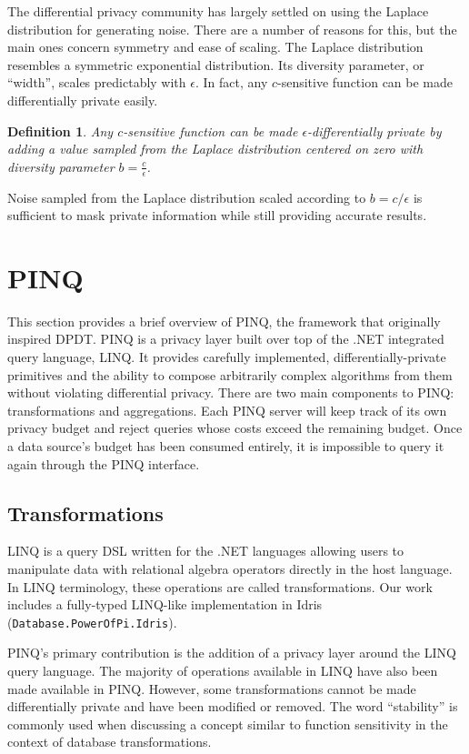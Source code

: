 \documentclass[12pt]{report}
\newtheorem{defn}{Definition}[section]
\begin{document}
The differential privacy community has largely settled on using the Laplace distribution for generating noise.
There are a number of reasons for this, but the main ones concern symmetry and ease of scaling.
The Laplace distribution resembles a symmetric exponential distribution.
Its diversity parameter, or ``width'', scales predictably with $\epsilon$.
In fact, any $c$-sensitive function can be made differentially private easily.

\begin{defn}
Any $c$-sensitive function can be made $\epsilon$-differentially private by adding a value sampled from the Laplace distribution centered on zero with diversity parameter $b=\frac{c}{\epsilon}$.
\end{defn}

Noise sampled from the Laplace distribution scaled according to $b=c/\epsilon$ is sufficient to mask private information while still providing accurate results.

\section{PINQ}\label{sec:pinq}

This section provides a brief overview of PINQ, the framework that originally inspired DPDT.
PINQ is a privacy layer built over top of the .NET integrated query language, LINQ.
It provides carefully implemented, differentially-private primitives and the ability to compose arbitrarily complex algorithms from them without violating differential privacy.
There are two main components to PINQ: transformations and aggregations.
Each PINQ server will keep track of its own privacy budget and reject queries whose costs exceed the remaining budget.
Once a data source's budget has been consumed entirely, it is impossible to query it again through the PINQ interface.

\subsection{Transformations}

LINQ is a query DSL written for the .NET languages allowing users to manipulate data with relational algebra operators directly in the host language.
In LINQ terminology, these operations are called transformations.
Our work includes a fully-typed LINQ-like implementation in Idris (\texttt{Database.PowerOfPi.Idris}).

PINQ's primary contribution is the addition of a privacy layer around the LINQ query language.
The majority of operations available in LINQ have also been made available in PINQ.
However, some transformations cannot be made differentially private and have been modified or removed.
The word ``stability'' is commonly used when discussing a concept similar to function sensitivity in the context of database transformations.
\end{document}
